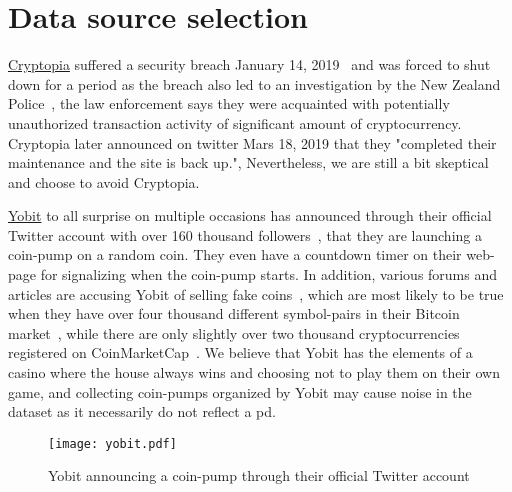 \section{Data source selection}

\href{https://www.cryptopia.co.nz/}{Cryptopia} suffered a security breach January 14, 2019~\cite{cryptopia_breach_2} and was forced to shut down for a period as the breach also led to an investigation by the New Zealand Police~\cite{cryptopia_breach_1}, the law enforcement says they were acquainted with potentially unauthorized transaction activity of significant amount of cryptocurrency. Cryptopia later announced on twitter Mars 18, 2019 that they "completed their maintenance and the site is back up.", Nevertheless, we are still a bit skeptical and choose to avoid Cryptopia.

\href{https://yobit.net/en/}{Yobit} to all surprise on multiple occasions has announced through their official Twitter account with over 160 thousand followers~\cite{yobit_twitter}, that they are launching a coin-pump on a random coin. They even have a countdown timer on their web-page for signalizing when the coin-pump starts. In addition, various forums and articles are accusing Yobit of selling fake coins~\cite{yobit_fake_1, yobit_fake_2, yobit_fake_3}, which are most likely to be true when they have over four thousand different symbol-pairs in their Bitcoin market~\cite{yobit_market}, while there are only slightly over two thousand cryptocurrencies registered on CoinMarketCap~\cite{coinmarketcap}. We believe that Yobit has the elements of a casino where the house always wins and choosing not to play them on their own game, and collecting coin-pumps organized by Yobit may cause noise in the dataset as it necessarily do not reflect a \ac{pd}.

\begin{figure}[ht]
    \centering
    \texttt{[image: yobit.pdf]}
    \caption{Yobit announcing a coin-pump through their official Twitter account}
    \label{fig:yobit}
\end{figure}



